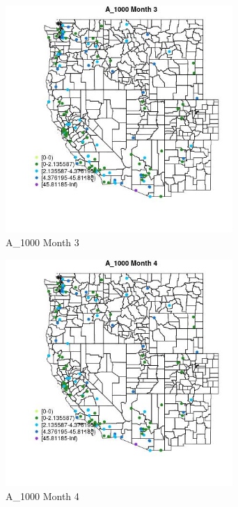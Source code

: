 \begin{figure} 
\centering  
\includegraphics[width=0.77\textwidth]{Code_Outputs/Report_ML_input_PM25_Step4_part_e_de_duplicated_aves_MapObsMo3A_1000.jpg} 
\caption{\label{fig:Report_ML_input_PM25_Step4_part_e_de_duplicated_avesMapObsMo3A_1000}A_1000 Month 3} 
\end{figure} 
 

\begin{figure} 
\centering  
\includegraphics[width=0.77\textwidth]{Code_Outputs/Report_ML_input_PM25_Step4_part_e_de_duplicated_aves_MapObsMo4A_1000.jpg} 
\caption{\label{fig:Report_ML_input_PM25_Step4_part_e_de_duplicated_avesMapObsMo4A_1000}A_1000 Month 4} 
\end{figure} 
 

